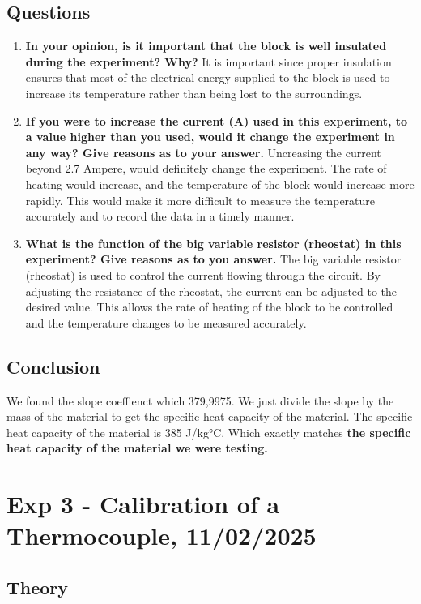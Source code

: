 \documentclass[a4paper]{article}
\begin{document}
    \subsection{Questions}
    \begin{enumerate}
        \item \textbf{In your opinion, is it important that the block is well insulated during the experiment? Why?}
        It is important since proper insulation ensures that most of 
        the electrical energy supplied to the block is used to increase its temperature rather than 
        being lost to the surroundings.
        \item \textbf{If you were to increase the current (A) used in this experiment, to a value higher than you used, would it change the experiment in any way? Give reasons as to your answer.}
        Uncreasing the current beyond 2.7 Ampere, would definitely change the experiment. The rate of heating would increase, and the temperature of the block would increase more rapidly. This would make it more difficult to measure the temperature accurately and to record the data in a timely manner.
        \item \textbf{What is the function of the big variable resistor (rheostat) in this experiment? Give reasons as to you answer.}
        The big variable resistor (rheostat) is used to control the current flowing through the circuit. By adjusting the resistance of the rheostat, the current can be adjusted to the desired value. This allows the rate of heating of the block to be controlled and the temperature changes to be measured accurately.
    \end{enumerate}

    \subsection{Conclusion}
    We found the slope coeffienct which 379,9975. We just divide the slope by the mass of the material to get the specific heat capacity of the material. The specific heat capacity of the material is 385 J/kg°C. Which exactly matches \textbf{the specific heat capacity of the material we were testing.}

\section{Exp 3 - Calibration of a Thermocouple, 11/02/2025}

\subsection{Theory}
\end{document}
